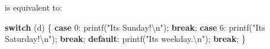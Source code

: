 \documentclass[
]{book}
\newenvironment{Shaded}{\begin{snugshade}}{\end{snugshade}}
\newcommand{\ControlFlowTok}[1]{\textcolor[rgb]{0.13,0.29,0.53}{\textbf{#1}}}
\newcommand{\DecValTok}[1]{\textcolor[rgb]{0.00,0.00,0.81}{#1}}
\newcommand{\NormalTok}[1]{#1}
\newcommand{\SpecialCharTok}[1]{\textcolor[rgb]{0.00,0.00,0.00}{#1}}
\newcommand{\StringTok}[1]{\textcolor[rgb]{0.31,0.60,0.02}{#1}}
\begin{document}
is equivalent to:

\begin{Shaded}
\begin{Highlighting}[]
\ControlFlowTok{switch}\NormalTok{ (d)}
\NormalTok{\{}
\ControlFlowTok{case} \DecValTok{0}\NormalTok{:}
\NormalTok{    printf(}\StringTok{"It\textquotesingle{}s Sunday!}\SpecialCharTok{\textbackslash{}n}\StringTok{"}\NormalTok{);}
    \ControlFlowTok{break}\NormalTok{;}
\ControlFlowTok{case} \DecValTok{6}\NormalTok{:}
\NormalTok{    printf(}\StringTok{"It\textquotesingle{}s Saturday!}\SpecialCharTok{\textbackslash{}n}\StringTok{"}\NormalTok{);}
    \ControlFlowTok{break}\NormalTok{;}
\ControlFlowTok{default}\NormalTok{:}
\NormalTok{    printf(}\StringTok{"It\textquotesingle{}s weekday.}\SpecialCharTok{\textbackslash{}n}\StringTok{"}\NormalTok{);}
    \ControlFlowTok{break}\NormalTok{;}
\NormalTok{\}}
\end{Highlighting}
\end{Shaded}


  
\end{document}

